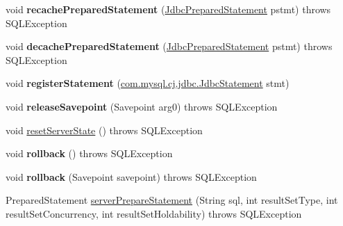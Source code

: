 \begin{DoxyCompactItemize}
void {\bfseries recache\+Prepared\+Statement} (\mbox{\hyperlink{interfacecom_1_1mysql_1_1cj_1_1jdbc_1_1_jdbc_prepared_statement}{Jdbc\+Prepared\+Statement}} pstmt)  throws S\+Q\+L\+Exception 
\item 
\mbox{\label{classcom_1_1mysql_1_1cj_1_1jdbc_1_1ha_1_1_multi_host_my_s_q_l_connection_aa76a527ef57c07af874082a721628649}} 
void {\bfseries decache\+Prepared\+Statement} (\mbox{\hyperlink{interfacecom_1_1mysql_1_1cj_1_1jdbc_1_1_jdbc_prepared_statement}{Jdbc\+Prepared\+Statement}} pstmt)  throws S\+Q\+L\+Exception 
\item 
\mbox{\label{classcom_1_1mysql_1_1cj_1_1jdbc_1_1ha_1_1_multi_host_my_s_q_l_connection_a1e99a20f35612593a661ee558af5fe4a}} 
void {\bfseries register\+Statement} (\mbox{\hyperlink{interfacecom_1_1mysql_1_1cj_1_1jdbc_1_1_jdbc_statement}{com.\+mysql.\+cj.\+jdbc.\+Jdbc\+Statement}} stmt)
\item 
\mbox{\label{classcom_1_1mysql_1_1cj_1_1jdbc_1_1ha_1_1_multi_host_my_s_q_l_connection_a5c0b01a8ac3f23eac0e521c2a6cd3c03}} 
void {\bfseries release\+Savepoint} (Savepoint arg0)  throws S\+Q\+L\+Exception 
\item 
void \mbox{\hyperlink{classcom_1_1mysql_1_1cj_1_1jdbc_1_1ha_1_1_multi_host_my_s_q_l_connection_aa4aba4efd08774027532a7a9092bca57}{reset\+Server\+State}} ()  throws S\+Q\+L\+Exception 
\item 
\mbox{\label{classcom_1_1mysql_1_1cj_1_1jdbc_1_1ha_1_1_multi_host_my_s_q_l_connection_a49c2cd6924eb0d929f0759b2cf0c440a}} 
void {\bfseries rollback} ()  throws S\+Q\+L\+Exception 
\item 
\mbox{\label{classcom_1_1mysql_1_1cj_1_1jdbc_1_1ha_1_1_multi_host_my_s_q_l_connection_a97829e74051e90c4363098f4797b7dd7}} 
void {\bfseries rollback} (Savepoint savepoint)  throws S\+Q\+L\+Exception 
\item 
Prepared\+Statement \mbox{\hyperlink{classcom_1_1mysql_1_1cj_1_1jdbc_1_1ha_1_1_multi_host_my_s_q_l_connection_aa64dae9148fe8777c14bf8dbe9ebebd1}{server\+Prepare\+Statement}} (String sql, int result\+Set\+Type, int result\+Set\+Concurrency, int result\+Set\+Holdability)  throws S\+Q\+L\+Exception 

\end{DoxyCompactItemize}
